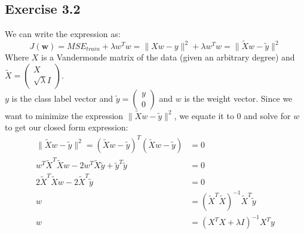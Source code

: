 \documentclass{article}
\begin{document}
\subsection*{Exercise 3.2}
We can write the expression as:
$$J(\textbf{w}) = MSE_{train} + \lambda w^T w = \|X w - y\|^2 + \lambda w^T w = \|\tilde X w - \tilde y\|^2$$
Where $X$ is a Vandermonde matrix of the data (given an arbitrary degree) and $\tilde X= \begin{pmatrix*}X \\ \sqrt{\lambda} I\end{pmatrix*}$.\\
$y$ is the class label vector and $\tilde y = \begin{pmatrix*}y \\ 0\end{pmatrix*}$ and $w$ is the weight vector.
Since we want to minimize the expression $ \|\tilde X w - \tilde y\|^2$, we equate it to 0 and solve for $w$ to get our closed form expression:
\begin{align*}
\|\tilde X w - \tilde y\|^2 = (\tilde X w - \tilde y)^T (\tilde X w - \tilde y) &= 0\\
w^T \tilde X^T \tilde X w - 2 w^T \tilde X \tilde y + \tilde y^T \tilde y &= 0 \\
2 \tilde X^T \tilde X w - 2 \tilde X^T \tilde y &= 0 \\
w &= (\tilde X^T \tilde X)^{-1} \tilde X^T \tilde y \\
w &= (X^T X + \lambda I)^{-1} X^T y 
\end{align*}
\end{document}
